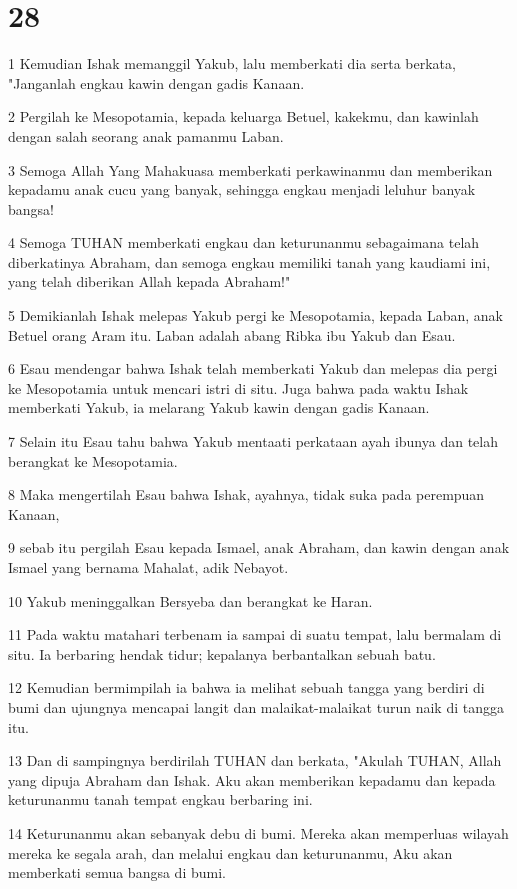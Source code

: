 \chapter{28}

\par 1 Kemudian Ishak memanggil Yakub, lalu memberkati dia serta berkata, "Janganlah engkau kawin dengan gadis Kanaan.
\par 2 Pergilah ke Mesopotamia, kepada keluarga Betuel, kakekmu, dan kawinlah dengan salah seorang anak pamanmu Laban.
\par 3 Semoga Allah Yang Mahakuasa memberkati perkawinanmu dan memberikan kepadamu anak cucu yang banyak, sehingga engkau menjadi leluhur banyak bangsa!
\par 4 Semoga TUHAN memberkati engkau dan keturunanmu sebagaimana telah diberkatinya Abraham, dan semoga engkau memiliki tanah yang kaudiami ini, yang telah diberikan Allah kepada Abraham!"
\par 5 Demikianlah Ishak melepas Yakub pergi ke Mesopotamia, kepada Laban, anak Betuel orang Aram itu. Laban adalah abang Ribka ibu Yakub dan Esau.
\par 6 Esau mendengar bahwa Ishak telah memberkati Yakub dan melepas dia pergi ke Mesopotamia untuk mencari istri di situ. Juga bahwa pada waktu Ishak memberkati Yakub, ia melarang Yakub kawin dengan gadis Kanaan.
\par 7 Selain itu Esau tahu bahwa Yakub mentaati perkataan ayah ibunya dan telah berangkat ke Mesopotamia.
\par 8 Maka mengertilah Esau bahwa Ishak, ayahnya, tidak suka pada perempuan Kanaan,
\par 9 sebab itu pergilah Esau kepada Ismael, anak Abraham, dan kawin dengan anak Ismael yang bernama Mahalat, adik Nebayot.
\par 10 Yakub meninggalkan Bersyeba dan berangkat ke Haran.
\par 11 Pada waktu matahari terbenam ia sampai di suatu tempat, lalu bermalam di situ. Ia berbaring hendak tidur; kepalanya berbantalkan sebuah batu.
\par 12 Kemudian bermimpilah ia bahwa ia melihat sebuah tangga yang berdiri di bumi dan ujungnya mencapai langit dan malaikat-malaikat turun naik di tangga itu.
\par 13 Dan di sampingnya berdirilah TUHAN dan berkata, "Akulah TUHAN, Allah yang dipuja Abraham dan Ishak. Aku akan memberikan kepadamu dan kepada keturunanmu tanah tempat engkau berbaring ini.
\par 14 Keturunanmu akan sebanyak debu di bumi. Mereka akan memperluas wilayah mereka ke segala arah, dan melalui engkau dan keturunanmu, Aku akan memberkati semua bangsa di bumi.
